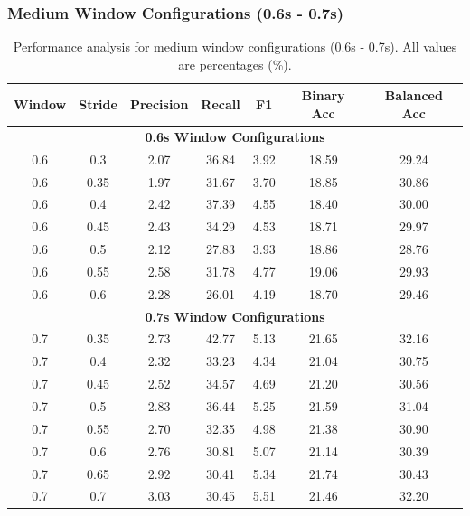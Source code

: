 \documentclass[11pt]{article}
\begin{document}
\subsubsection{Medium Window Configurations (0.6s - 0.7s)}

\begin{table}[H]
    \caption{Performance analysis for medium window configurations (0.6s - 0.7s). All values are percentages (\%).}
    \centering
    \label{tab:medium-window-configs}
    \footnotesize
    \begin{tabular}{|c|c|c|c|c|c|c|}
        \hline
        \textbf{Window} & \textbf{Stride} & \textbf{Precision} & \textbf{Recall} & \textbf{F1} & \textbf{Binary Acc} & \textbf{Balanced Acc} \\
        \hline
        \multicolumn{7}{|c|}{\textbf{0.6s Window Configurations}} \\
        \hline
        0.6 & 0.3 & 2.07 & 36.84 & 3.92 & 18.59 & 29.24 \\
        0.6 & 0.35 & 1.97 & 31.67 & 3.70 & 18.85 & 30.86 \\
        0.6 & 0.4 & 2.42 & 37.39 & 4.55 & 18.40 & 30.00 \\
        0.6 & 0.45 & 2.43 & 34.29 & 4.53 & 18.71 & 29.97 \\
        0.6 & 0.5 & 2.12 & 27.83 & 3.93 & 18.86 & 28.76 \\
        0.6 & 0.55 & 2.58 & 31.78 & 4.77 & 19.06 & 29.93 \\
        0.6 & 0.6 & 2.28 & 26.01 & 4.19 & 18.70 & 29.46 \\
        \hline
        \multicolumn{7}{|c|}{\textbf{0.7s Window Configurations}} \\
        \hline
        0.7 & 0.35 & 2.73 & 42.77 & 5.13 & 21.65 & 32.16 \\
        0.7 & 0.4 & 2.32 & 33.23 & 4.34 & 21.04 & 30.75 \\
        0.7 & 0.45 & 2.52 & 34.57 & 4.69 & 21.20 & 30.56 \\
        0.7 & 0.5 & 2.83 & 36.44 & 5.25 & 21.59 & 31.04 \\
        0.7 & 0.55 & 2.70 & 32.35 & 4.98 & 21.38 & 30.90 \\
        0.7 & 0.6 & 2.76 & 30.81 & 5.07 & 21.14 & 30.39 \\
        0.7 & 0.65 & 2.92 & 30.41 & 5.34 & 21.74 & 30.43 \\
        0.7 & 0.7 & 3.03 & 30.45 & 5.51 & 21.46 & 32.20 \\
        \hline
    \end{tabular}
\end{table}
\end{document}
